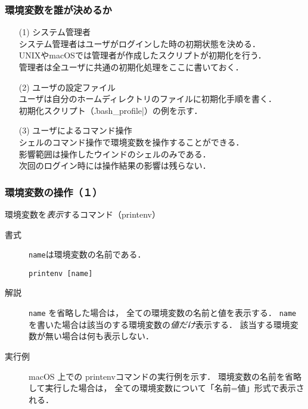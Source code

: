 \documentclass{beamer}                 %
\begin{document}
\begin{frame}[fragile]
  \frametitle{環境変数を誰が決めるか}
  \begin{enumerate}
  \item[(1)] システム管理者\\
    システム管理者はユーザがログインした時の初期状態を決める．\\
    UNIXやmacOSでは管理者が作成したスクリプトが初期化を行う．\\
    管理者は全ユーザに共通の初期化処理をここに書いておく．
  \item[(2)] ユーザの設定ファイル \\
    ユーザは自分のホームディレクトリのファイルに初期化手順を書く．\\
    初期化スクリプト（\|.bash_profile|）の例を示す．
  \item[(3)] ユーザによるコマンド操作 \\
    シェルのコマンド操作で環境変数を操作することができる．\\
    影響範囲は操作したウインドのシェルのみである．\\
    次回のログイン時には操作結果の影響は残らない．\\
  \end{enumerate}
\end{frame}

\begin{frame}[fragile]
  \frametitle{環境変数の操作（１）}
  環境変数を\emph{表示}するコマンド（printenv）
\begin{description}
\item[書式] \texttt{name}は環境変数の名前である．
\begin{lstlisting}[numbers=none]
  printenv [name]
\end{lstlisting}
\item[解説]
  \texttt{name} を省略した場合は，
  全ての環境変数の名前と値を表示する．
  \texttt{name} を書いた場合は該当のする環境変数の\emph{値だけ}表示する．
  該当する環境変数が無い場合は何も表示しない．
\item [実行例]  macOS 上での printenvコマンドの実行例を示す．
  環境変数の名前を省略して実行した場合は，
  全ての環境変数について「名前=値」形式で表示される．
\end{description}
\end{frame}
\end{document}
